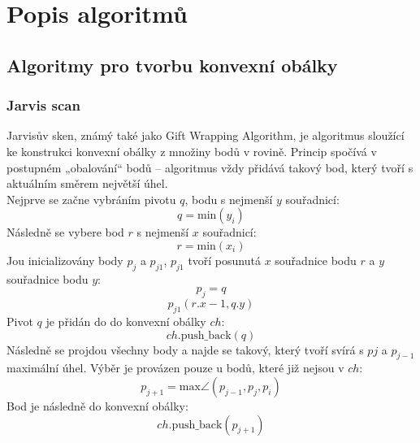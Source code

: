 \section{Popis algoritmů}

\subsection{Algoritmy pro tvorbu konvexní obálky}

\subsubsection{Jarvis scan}
Jarvisův sken, známý také jako Gift Wrapping Algorithm, je algoritmus sloužící ke konstrukci konvexní obálky z množiny bodů v rovině. Princip spočívá v postupném „obalování“ bodů – algoritmus vždy přidává takový bod, který tvoří s aktuálním směrem největší úhel.\\

\hspace{-1.15cm}
Nejprve se začne vybráním pivotu $q$, bodu s nejmenší $y$ souřadnicí:
\begin{equation}
    q = \text{min}(y_i)
\end{equation}
Následně se vybere bod $r$ s nejmenší $x$ souřadnicí:
\begin{equation}
    r = \text{min}(x_i)
\end{equation}
Jou inicializovány body $p_j$ a $p_{j1}$, $p_{j1}$ tvoří posunutá $x$ souřadnice bodu $r$ a $y$ souřadnice bodu $y$:
\begin{equation}
    p_j = q
\end{equation}
\begin{equation}
    p_{j1}(r.x-1,q.y)
\end{equation}
Pivot $q$ je přidán do do konvexní obálky $ch$:
\begin{equation}
    ch.\text{push\_back}(q)
\end{equation}
Následně se projdou všechny body a najde se takový, který tvoří svírá s $p{j}$ a $p_{j-1}$ maximální úhel. Výběr je provázen pouze u bodů, které již nejsou v $ch$:
\begin{equation}
    p_{j+1} = \text{max} \angle( p_{j-1},p_j, p_i)
\end{equation}
Bod je následně do konvexní obálky:
\begin{equation}
    ch.\text{push\_back}(p_{j+1})
\end{equation}



